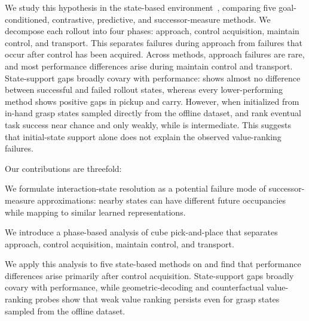 We study this hypothesis in the state-based \ogbench{} \task{} environment~\citep{park-iclr25a}, comparing five goal-conditioned, contrastive, predictive, and successor-measure methods.
We decompose each rollout into four phases: approach, control acquisition, maintain control, and transport.
This separates failures during approach from failures that occur after control has been acquired.
Across methods, approach failures are rare, and most performance differences arise during maintain control and transport.
State-support gaps broadly covary with performance: \gciql{} shows almost no difference between successful and failed rollout states, whereas every lower-performing method shows positive gaps in pickup and carry.
However, when initialized from in-hand grasp states sampled directly from the offline dataset, \rldp{} and \psm{} rank eventual task success near chance and \fb{} only weakly, while \crl{} is intermediate.
This suggests that initial-state support alone does not explain the observed value-ranking failures.

Our contributions are threefold:
\begin{inparaenum}[(i)]
    \item We formulate interaction-state resolution as a potential failure mode of successor-measure approximations: nearby states can have different future occupancies while mapping to similar learned representations.
    \item We introduce a phase-based analysis of cube pick-and-place that separates approach, control acquisition, maintain control, and transport.
    \item We apply this analysis to five state-based methods on \ogbench{} \task{} and find that performance differences arise primarily after control acquisition. State-support gaps broadly covary with performance, while geometric-decoding and counterfactual value-ranking probes show that weak value ranking persists even for grasp states sampled from the offline dataset.
\end{inparaenum}